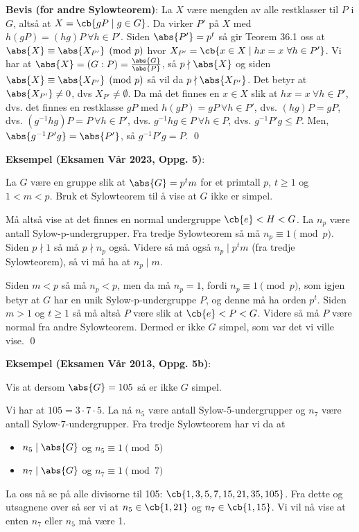 \textbf{Bevis (for andre Sylowteorem)}: La $X$ være mengden av alle restklasser til $P$ i $G$,
altså at $X = \cb{gP\mid g\in G}$. Da virker $P'$ på $X$ med $h(gP)=(hg)P\ \forall h\in P'$. 
Siden $\abs{P'}=p^t$ så gir Teorem 36.1 oss at $\abs{X}\equiv \abs{X_{P'}} \pmod{p}$ hvor
$X_{P'}=\cb{x\in X\mid hx = x\ \forall h\in P'}$. Vi har at 
$\abs{X}=(G:P)=\frac{\abs{G}}{\abs{P}}$, så $p\nmid \abs{X}$ og siden 
$\abs{X}\equiv\abs{X_{P'}}\pmod{p}$ så vil da $p\nmid \abs{X_{P'}}$. Det betyr at 
$\abs{X_{P'}}\neq 0$, dvs $X_{P'}\neq \emptyset$. Da må det finnes en $x\in X$ slik at
$hx=x\ \forall h\in P'$, dvs. det finnes en restklasse $gP$ med $h(gP)=gP\ \forall h\in P'$, 
dvs. $(hg)P=gP$, dvs. $(g^{-1}hg)P=P\ \forall h\in P'$, dvs. $g^{-1}hg\in P\ \forall h\in P$,
dvs. $g^{-1}P'g\leq P$. Men, $\abs{g^{-1}P'g}=\abs{P'}$, så $g^{-1}P'g=P$. \qed 

\textbf{Eksempel (Eksamen Vår 2023, Oppg. 5)}:

La $G$ være en gruppe slik at $\abs{G}=p^tm$ for et primtall $p$, $t\geq 1$ og $1 < m < p$. Bruk
et Sylowteorem til å vise at $G$ ikke er simpel.

Må altså vise at det finnes en normal undergruppe $\cb{e}<H<G$. La $n_p$ være antall 
Sylow-p-undergrupper. Fra tredje Sylowteorem så må $n_p \equiv 1 \pmod{p}$.
Siden $p \nmid 1$ så må $p \nmid n_p$ også. Videre så må også $n_p \mid p^tm$ (fra tredje 
Sylowteorem), så vi må ha at $n_p \mid m$. 

Siden $m < p$ så må $n_p < p$, men da må $n_p = 1$, fordi $n_p \equiv 1 \pmod{p}$, som igjen
betyr at $G$ har en unik Sylow-p-undergruppe $P$, og denne må ha orden $p^t$. Siden $m > 1$ og
$t \geq 1$ så må altså $P$ være slik at $\cb{e}<P<G$. Videre så må $P$ være normal fra andre
Sylowteorem. Dermed er ikke $G$ simpel, som var det vi ville vise. \qed

\textbf{Eksempel (Eksamen Vår 2013, Oppg. 5b)}:

Vis at dersom $\abs{G} = 105$ så er ikke $G$ simpel.

Vi har at $105 = 3\cdot 7\cdot 5$. La nå $n_5$ være antall Sylow-5-undergrupper og $n_7$ være
antall Sylow-7-undergrupper. Fra tredje Sylowteorem har vi da at
\begin{itemize}
  \item $n_5 \mid \abs{G}$ og $n_5 \equiv 1 \pmod{5}$
  \item $n_7 \mid \abs{G}$ og $n_7 \equiv 1 \pmod{7}$
\end{itemize}
La oss nå se på alle divisorne til 105: $\cb{1, 3, 5, 7, 15, 21, 35, 105}$. Fra dette og utsagnene
over så ser vi at $n_5\in \cb{1, 21}$ og $n_7\in \cb{1, 15}$. Vi vil nå vise at enten $n_7$ eller 
$n_5$ må være 1.

